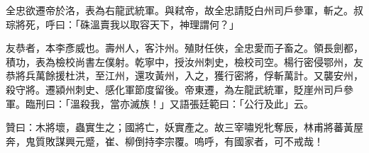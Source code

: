 \begin{pinyinscope}
 全忠欲遷帝於洛，表為右龍武統軍。與弒帝，故全忠請貶白州司戶參軍，斬之。叔琮將死，呼曰：「硃溫賣我以取容天下，神理謂何？」



 友恭者，本李彥威也。壽州人，客汴州。殖財任俠，全忠愛而子畜之。領長劍都，積功，表為檢校尚書左僕射。乾寧中，授汝州刺史，檢校司空。楊行密侵鄂州，友恭將兵萬餘援杜洪，至江州，還攻黃州，入之，獲行密將，俘斬萬計。又襲安州，殺守將。遷潁州刺史、感化軍節度留後。帝東遷，為左龍武統軍，貶崖州司戶參軍。臨刑曰：「溫殺我，當亦滅族！」又語張廷範曰：「公行及此」云。



 贊曰：木將壞，蟲實生之；國將亡，妖實產之。故三宰嘯兇牝奪辰，林甫將蕃黃屋奔，鬼質敗謀興元蹙，崔、柳倒持李宗覆。嗚呼，有國家者，可不戒哉！



\end{pinyinscope}